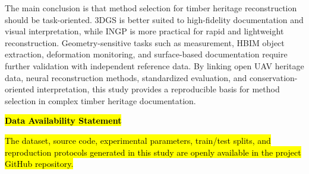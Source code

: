 The main conclusion is that method selection for timber heritage
reconstruction should be task-oriented. 3DGS is better suited to
high-fidelity documentation and visual interpretation, while INGP is
more practical for rapid and lightweight reconstruction.
Geometry-sensitive tasks such as measurement, HBIM object extraction,
deformation monitoring, and surface-based documentation require further
validation with independent reference data. By linking open UAV heritage
data, neural reconstruction methods, standardized evaluation, and
conservation-oriented interpretation, this study provides a reproducible
basis for method selection in complex timber heritage documentation.

\textbf{\hl{Data Availability Statement}}

\hl{The dataset, source code, experimental parameters, train/test
splits, and reproduction protocols generated in this study are openly
available in the project GitHub repository.}
